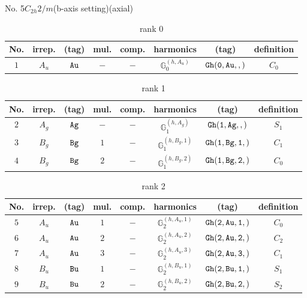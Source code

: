 \documentclass[fleqn,8pt]{jsarticle}
\begin{document}
\setcounter{MaxMatrixCols}{16}

\begin{center}
\LARGE
No. 5\quad$C_{2h}$\quad$2/m$\quad(b-axis setting)\quad[ monoclinic ] (axial)
\end{center}
\begin{table}[ht!]
\begin{center}
\caption{rank 0}
\renewcommand{\arraystretch}{1.3}
\begin{tabular}{cccccccc} \hline \hline
No. & irrep. & (tag) & mul. & comp. & harmonics & (tag) & definition \\ \hline
$ 1 $ & $ A_{u} $ & $ {\tt Au} $ & $ - $ & $ - $ & $ \mathbb{G}_{0}^{(h,A_{u})} $ & $ {\tt Gh(0,Au,,)} $ & $ C_{0} $ \\
 \hline \hline
\end{tabular}
\end{center}
\end{table}
\begin{table}[ht!]
\begin{center}
\caption{rank 1}
\renewcommand{\arraystretch}{1.3}
\begin{tabular}{cccccccc} \hline \hline
No. & irrep. & (tag) & mul. & comp. & harmonics & (tag) & definition \\ \hline
$ 2 $ & $ A_{g} $ & $ {\tt Ag} $ & $ - $ & $ - $ & $ \mathbb{G}_{1}^{(h,A_{g})} $ & $ {\tt Gh(1,Ag,,)} $ & $ S_{1} $ \\
$ 3 $ & $ B_{g} $ & $ {\tt Bg} $ & $ 1 $ & $ - $ & $ \mathbb{G}_{1}^{(h,B_{g},1)} $ & $ {\tt Gh(1,Bg,1,)} $ & $ C_{1} $ \\
$ 4 $ & $ B_{g} $ & $ {\tt Bg} $ & $ 2 $ & $ - $ & $ \mathbb{G}_{1}^{(h,B_{g},2)} $ & $ {\tt Gh(1,Bg,2,)} $ & $ C_{0} $ \\
 \hline \hline
\end{tabular}
\end{center}
\end{table}
\begin{table}[ht!]
\begin{center}
\caption{rank 2}
\renewcommand{\arraystretch}{1.3}
\begin{tabular}{cccccccc} \hline \hline
No. & irrep. & (tag) & mul. & comp. & harmonics & (tag) & definition \\ \hline
$ 5 $ & $ A_{u} $ & $ {\tt Au} $ & $ 1 $ & $ - $ & $ \mathbb{G}_{2}^{(h,A_{u},1)} $ & $ {\tt Gh(2,Au,1,)} $ & $ C_{0} $ \\
$ 6 $ & $ A_{u} $ & $ {\tt Au} $ & $ 2 $ & $ - $ & $ \mathbb{G}_{2}^{(h,A_{u},2)} $ & $ {\tt Gh(2,Au,2,)} $ & $ C_{2} $ \\
$ 7 $ & $ A_{u} $ & $ {\tt Au} $ & $ 3 $ & $ - $ & $ \mathbb{G}_{2}^{(h,A_{u},3)} $ & $ {\tt Gh(2,Au,3,)} $ & $ C_{1} $ \\
$ 8 $ & $ B_{u} $ & $ {\tt Bu} $ & $ 1 $ & $ - $ & $ \mathbb{G}_{2}^{(h,B_{u},1)} $ & $ {\tt Gh(2,Bu,1,)} $ & $ S_{1} $ \\
$ 9 $ & $ B_{u} $ & $ {\tt Bu} $ & $ 2 $ & $ - $ & $ \mathbb{G}_{2}^{(h,B_{u},2)} $ & $ {\tt Gh(2,Bu,2,)} $ & $ S_{2} $ \\
 \hline \hline
\end{tabular}
\end{center}
\end{table}
\end{document}
